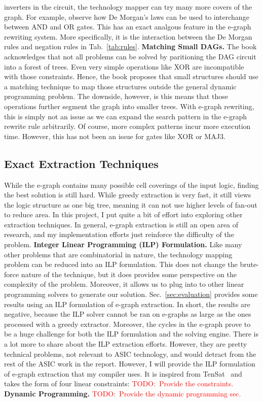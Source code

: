 \documentclass[10pt,letterpaper]{article}
\newcommand{\todo}[1]{\textcolor{red}{TODO:\ #1}}
\begin{document}
inverters in the circuit, the technology mapper can try many more covers of the
graph. For example, observe how De Morgan's laws can be used to interchange
between AND and OR gates. This has an exact analgous feature in the e-graph
rewriting system. More specifically, it is the interaction between the De
Morgan rules and negation rules in Tab.~\ref{tab:rules}. \bigbreak{} \noindent
\textbf{Matching Small DAGs.} The book acknowledges that not all problems can
be solved by paritioning the DAG circuit into a forest of trees. Even very
simple operations like XOR are incompatible with those constraints. Hence, the
book proposes that small structures should use a matching technique to map
those structures outside the general dynamic programming problem. The downside,
however, is this means that those operations further segment the graph into
smaller trees. With e-graph rewriting, this is simply not an issue as we can
expand the search pattern in the e-graph rewrite rule arbitrarily. Of course,
more complex patterns incur more execution time. However, this has not been an
issue for gates like XOR or MAJ3.

\subsection{Exact Extraction Techniques}\label{sec:alt:extraction}

While the e-graph contains many possible cell coverings of the input logic,
finding the best solution is still hard. While greedy extraction is very fast,
it still views the logic structure as one big tree, meaning it can not use
higher levels of fan-out to reduce area. In this project, I put quite a bit of
effort into exploring other extraction techniques. In general, e-graph
extraction is still an open area of research, and my implementation efforts
just reinforce the difficulty of the problem. \bigbreak{} \noindent
\textbf{Integer Linear Programming (ILP) Formulation.} Like many other problems
that are combinatorial in nature, the technology mapping problem can be reduced
into an ILP formulation. This does not change the brute-force nature of the
technique, but it does provides some perspective on the complexity of the
problem. Moreover, it allows us to plug into to other linear programming
solvers to generate our solution. Sec.~\ref{sec:evaluation} provides some
results using an ILP formulation of e-graph extraction. In short, the results
are negative, because the ILP solver cannot be ran on e-graphs as large as the
ones processed with a greedy extractor. Moreover, the cycles in the e-graph
prove to be a huge challenge for both the ILP formulation and the solving
engine. There is a lot more to share about the ILP extraction efforts. However,
they are pretty technical problems, not relevant to ASIC technology, and would
detract from the rest of the ASIC work in the report. However, I will provide
the ILP formulation of e-graph extraction that my compiler uses. It is inspired
from TenSat~\cite{ilpextract} and takes the form of four linear constraints:
\todo{Provide the constraints.} \bigbreak{} \noindent \textbf{Dynamic
    Programming.} \todo{Provide the dynamic programming sec.}
\end{document}
